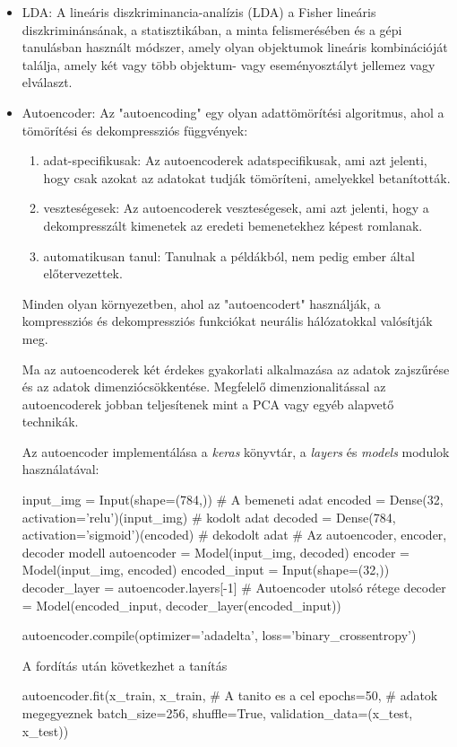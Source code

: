\begin{itemize}
\item LDA\cite{wang2003feature}: A lineáris diszkriminancia-analízis (LDA) a Fisher lineáris diszkriminánsának, a statisztikában, a minta felismerésében és a gépi tanulásban használt módszer, amely olyan objektumok lineáris kombinációját találja, amely két vagy több objektum- vagy eseményosztályt jellemez vagy elválaszt.
\item Autoencoder: Az "autoencoding" egy olyan adattömörítési algoritmus, ahol a tömörítési és dekompressziós függvények:
\begin{enumerate}
\item adat-specifikusak: Az autoencoderek adatspecifikusak, ami azt jelenti, hogy csak azokat az adatokat tudják tömöríteni, amelyekkel betanították.
\item veszteségesek: Az autoencoderek veszteségesek, ami azt jelenti, hogy a dekompresszált kimenetek az eredeti bemenetekhez képest romlanak.
\item automatikusan tanul: Tanulnak a példákból, nem pedig ember által előtervezettek.
\end{enumerate}
Minden olyan környezetben, ahol az "autoencodert" használják, a kompressziós és dekompressziós funkciókat neurális hálózatokkal valósítják meg.

Ma az autoencoderek két érdekes gyakorlati alkalmazása az adatok zajszűrése és az adatok dimenziócsökkentése. Megfelelő dimenzionalitással az autoencoderek jobban teljesítenek mint a PCA vagy egyéb alapvető technikák.

Az autoencoder implementálása a \textit{keras} könyvtár, a  \textit{layers} és \textit{models} modulok használatával:
\begin{python}

input_img = Input(shape=(784,)) # A bemeneti adat
encoded = Dense(32, activation='relu')(input_img) # kodolt adat
decoded = Dense(784, activation='sigmoid')(encoded) # dekodolt adat
# Az autoencoder, encoder, decoder modell
autoencoder = Model(input_img, decoded)
encoder = Model(input_img, encoded)
encoded_input = Input(shape=(32,))
decoder_layer = autoencoder.layers[-1] # Autoencoder utolsó rétege
decoder = Model(encoded_input, decoder_layer(encoded_input))
\end{python}
\begin{python}
autoencoder.compile(optimizer='adadelta', loss='binary_crossentropy')
\end{python}
A fordítás után következhet a tanítás
\begin{python}
autoencoder.fit(x_train, x_train,	# A tanito es a cel
                epochs=50,		# adatok megegyeznek
                batch_size=256,
                shuffle=True,
                validation_data=(x_test, x_test))
\end{python}
\end{itemize}

